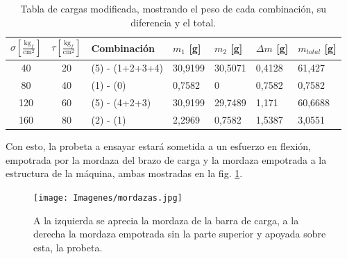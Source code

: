\begin{table}[h]
\centering
\begin{tabular}{@{}cclllll@{}}
\toprule
$\sigma \left[\frac{\text{kg}_f}{\text{cm}^2}\right]$ & {$\tau \left[\frac{\text{kg}_f}{\text{cm}^2}\right]$} & Combinación     & $m_1$ {[}g{]} & $m_2$ {[}g{]} & $\Delta m$ {[}g{]} & $m_{total}$ {[}g{]} \\ \midrule
40                                                   & 20                                                                    & (5) - (1+2+3+4) & 30,9199       & 30,5071       & 0,4128             & 61,427              \\
80                                                   & 40                                                                    & (1) - (0)       & 0,7582        & 0             & 0,7582             & 0,7582              \\
120                                                  & 60                                                                    & (5) - (4+2+3)   & 30,9199       & 29,7489       & 1,171              & 60,6688             \\
160                                                  & 80                                                                    & (2) - (1)       & 2,2969        & 0,7582        & 1,5387             & 3,0551              \\ \bottomrule
\end{tabular}
\caption{Tabla de cargas modificada, mostrando el peso de cada combinación, su diferencia y el total.}
\label{tab:ejemplo_config}
\end{table}

Con esto, la probeta a ensayar estará sometida a un esfuerzo en flexión, empotrada por la mordaza del brazo de carga y la mordaza empotrada a la estructura de la máquina, ambas mostradas en la fig. \ref{fig:mordazas}.

\begin{figure}[h]
\centering
\texttt{[image: Imagenes/mordazas.jpg]}
\caption{A la izquierda se aprecia la mordaza de la barra de carga, a la derecha la mordaza empotrada sin la parte superior y apoyada sobre esta, la probeta.}
\label{fig:mordazas}
\end{figure}

